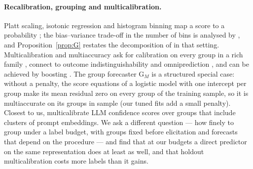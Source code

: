 \documentclass[11pt]{article}
\theoremstyle{definition}
\theoremstyle{remark}
\newcommand{\1}{\mathbf{1}}
\begin{document}
\paragraph{Recalibration, grouping and multicalibration.} Platt scaling, isotonic regression and
histogram binning map a score to a probability \citep{platt1999probabilistic,zadrozny2002transforming,guo2017calibration};
the bias--variance trade-off in the number of bins is analysed by
\citet{kumar2019verified,gupta2021distribution,sun2023minimum,futami2024information}, and
Proposition~\ref{prop:G} restates the decomposition of \citet{murphy1973new} in that setting.
Multicalibration and multiaccuracy ask for calibration on every group in a rich family
\citep{hebertjohnson2018multicalibration,kim2019multiaccuracy,shabat2020sample}, connect to outcome
indistinguishability and omniprediction \citep{dwork2021outcome,gopalan2022omnipredictors}, and can be
achieved by boosting \citep{globusharris2023multicalibration}. The group forecaster G$_M$ is a structured
special case: without a penalty, the score equations of a logistic model with one intercept per group
make its mean residual zero on every group of the training sample, so it is multiaccurate on its
groups in sample (our tuned fits add a small penalty). Closest to us, \citet{detommaso2024multicalibration} multicalibrate LLM confidence
scores over groups that include clusters of prompt embeddings. We ask a different question --- how
finely to group under a label budget, with groups fixed before elicitation and forecasts that depend
on the procedure --- and find that at our budgets a direct predictor on the same representation does
at least as well, and that holdout multicalibration costs more labels than it gains.
\end{document}
